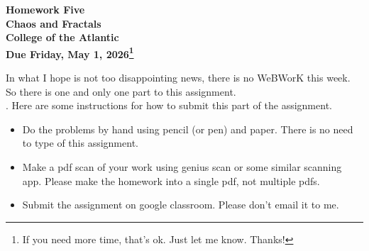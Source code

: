 \documentclass[14pt]{extarticle}
\begin{document}
\pagestyle{empty}
 
\begin{center}
{\LARGE {\bf Homework Five}}\\
\bigskip
{\Large {\bf Chaos and Fractals}}\\
\bigskip
{\Large {\bf College of the Atlantic}}\\
\bigskip
{ {\bf Due Friday, May 1, 2026\footnote{If you need more time,
      that's ok. Just let me know. Thanks!}}}\\  
\end{center}
\medskip


\noindent In what I hope is not too disappointing news, there is no
WeBWorK this week. So there is one and only one part to this
assignment.\\  



.  Here are some
instructions for how to submit this part of the assignment.
\begin{itemize}
\item Do the problems by hand using pencil (or pen) and paper.
  There is no need to type of this assignment.
\item Make a pdf scan of your work using genius scan or some
  similar scanning app. Please make the homework into a single
  pdf, not multiple pdfs.
\item Submit the assignment on google classroom.  Please don't
  email it to me. 
\end{itemize}
\end{document}
